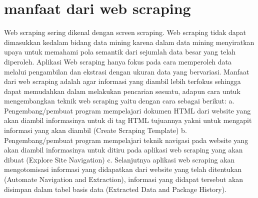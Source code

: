 \documentclass[12pt, a4paper]{article}
\begin{document}
\section{manfaat dari web scraping}
Web scraping sering dikenal dengan screen scraping. Web scraping tidak dapat dimasukkan kedalam bidang data
mining karena dalam data mining menyiratkan upaya untuk memahami pola semantik dari sejumlah data besar yang
telah diperoleh. Aplikasi Web scraping hanya fokus pada cara memperoleh data melalui pengambilan dan ekstrasi
dengan ukuran data yang bervariasi. Manfaat dari web scraping adalah agar informasi yang diambil lebih
terfokus sehingga dapat memudahkan dalam melakukan pencarian sesuatu, adapun cara untuk mengembangkan teknik
web scraping yaitu dengan cara sebagai berikut:
	a. Pengembang/pembuat program mempelajari dokumen HTML dari website yang akan diambil informasinya untuk
	   di tag HTML tujuannya yakni untuk mengapit informasi yang akan diambil (Create Scraping Template)
	b. Pengembang/pembuat program mempelajari teknik navigasi pada website yang akan diambil informasinya
	   untuk ditiru pada aplikasi web scraping yang akan dibuat (Explore Site Navigation)
	c. Selanjutnya aplikasi web scraping akan mengotomisasi informasi yang didapatkan dari website yang telah
	   ditentukan (Automate Navigation and Extraction), informasi yang didapat tersebut akan disimpan dalam 
	   tabel basis data (Extracted Data and Package History).
\end{document}
